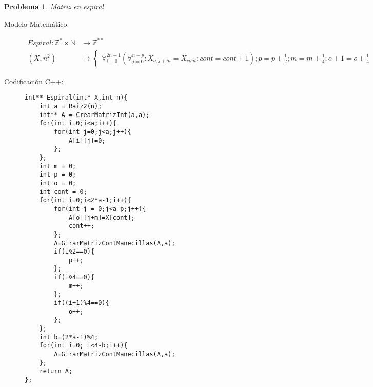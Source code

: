 \documentclass{article}
\theoremstyle{plain}
\theoremstyle{definition}
\newtheorem{problem}{Problema}
\begin{document}
\begin{problem} \emph{Matriz en espiral }\\
\begin{description}
\item[Modelo Matemático:]
\begin{align*}
Espiral: \mathbb{Z}^{*}\times\mathbb{N} &\to \mathbb{Z}^{**}\\
(X,n^2) &\mapsto
\begin{cases}
\forall_{i=0}^{2n-1} \left(\forall_{j=0}^{n-p}: X_{o,j+m}=X_{cont};cont=cont+1\right); p=p+\frac{1}{2};m=m+\frac{1}{4};o+1=o+\frac{1}{4}
\end{cases}
\end{align*}
%
\item[Codificación \textsf{C++}:]\hfill
%
\begin{verbatim}
int** Espiral(int* X,int n){
    int a = Raiz2(n);
    int** A = CrearMatrizInt(a,a);
    for(int i=0;i<a;i++){
        for(int j=0;j<a;j++){
            A[i][j]=0;
        };
    };
    int m = 0;
    int p = 0;
    int o = 0;
    int cont = 0;
    for(int i=0;i<2*a-1;i++){
        for(int j = 0;j<a-p;j++){
            A[o][j+m]=X[cont];
            cont++;
        };
        A=GirarMatrizContManecillas(A,a);
        if(i%2==0){
            p++;
        };
        if(i%4==0){
            m++;
        };
        if((i+1)%4==0){
            o++;
        };
    };
    int b=(2*a-1)%4;
    for(int i=0; i<4-b;i++){
        A=GirarMatrizContManecillas(A,a);
    };
    return A;
};
\end{verbatim}
\end{description}
\end{problem}
\end{document}
